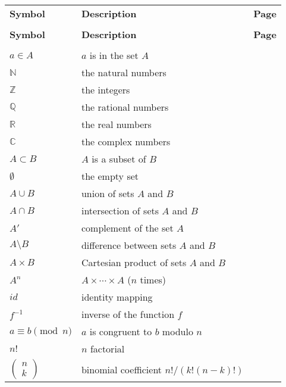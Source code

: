 \begin{center}
\begin{longtable}{llr}
%
\multicolumn{1}{l}{\bf Symbol} & \multicolumn{1}{l}{\bf Description} & \multicolumn{1}{r}{\bf Page} \\
&&\\
\endfirsthead
%
\multicolumn{1}{l}{\bf Symbol} & \multicolumn{1}{l}{\bf Description} & \multicolumn{1}{r}{\bf Page} \\
&&\\
\endhead
%
$a \in A$ & $a$ is in the set $A$ & \pageref{setmembership} \\
%
${\mathbb N}$ & the natural numbers & \pageref{naturalnum} \\
%
${\mathbb Z}$ & the integers & \pageref{integers} \\
%
${\mathbb Q}$ & the rational numbers & \pageref{rationals} \\
%
${\mathbb R}$ & the real numbers & \pageref{reals} \\
%
${\mathbb C}$ & the complex numbers & \pageref{complexnum} \\
%
$A \subset B$ & $A$ is a subset of $B$ & \pageref{setcontain} \\
%
$\emptyset$ & the empty set & \pageref{theemptyset} \\
%
$A \cup B$ & union of sets $A$ and $B$ & \pageref{union} \\
%
$A \cap B$ & intersection of sets $A$ and $B$ & \pageref{intersection} \\
%
$A'$ & complement of the  set $A$ & \pageref{setcomplement} \\
%
$A \setminus B$ & difference between sets $A$ and $B$ & \pageref{setdifference} \\
%
$A \times B$ & Cartesian product of sets $A$ and $B$ & \pageref{cartesian} \\
%
$A^n$ & $A \times \cdots \times A$ ($n$ times) & \pageref{ncartesian} \\
%
$id$ & identity mapping & \pageref{noteidentity} \\
%
$f^{-1}$ & inverse of the function $f$	& \pageref{inversefunc} \\
%
$a \equiv b \pmod{n}$ & $a$ is congruent to $b$ modulo $n$ & \pageref{amodb} \\
%
$n!$ & $n$ factorial & \pageref{factorial} \\
%
$\left(\begin{array}{c}n \\ k \end{array} \right)$ & binomial coefficient $n!/(k! (n-k)!)$ & \pageref{binomial} \\

\end{longtable}
\end{center}
